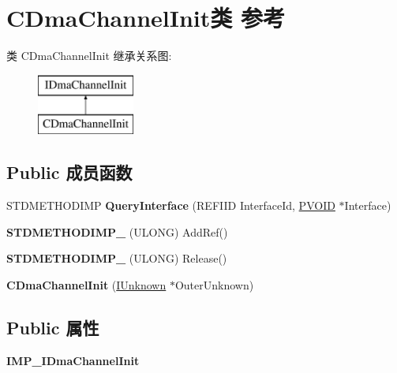 \hypertarget{class_c_dma_channel_init}{}\section{C\+Dma\+Channel\+Init类 参考}
\label{class_c_dma_channel_init}
类 C\+Dma\+Channel\+Init 继承关系图\+:\begin{figure}[H]
\begin{center}
\leavevmode
\includegraphics[height=2.000000cm]{class_c_dma_channel_init}
\end{center}
\end{figure}
\subsection*{Public 成员函数}
\begin{DoxyCompactItemize}
\item 
\mbox{\label{class_c_dma_channel_init_ae421fabc39c46402e245bc0d9496182a}} 
S\+T\+D\+M\+E\+T\+H\+O\+D\+I\+MP {\bfseries Query\+Interface} (R\+E\+F\+I\+ID Interface\+Id, \hyperlink{interfacevoid}{P\+V\+O\+ID} $\ast$Interface)
\item 
\mbox{\label{class_c_dma_channel_init_a0effed86839819835c176a9ee7061f5b}} 
{\bfseries S\+T\+D\+M\+E\+T\+H\+O\+D\+I\+M\+P\+\_\+} (U\+L\+O\+NG) Add\+Ref()
\item 
\mbox{\label{class_c_dma_channel_init_a31f2b9279468892f2b87d6f1f4ee0f45}} 
{\bfseries S\+T\+D\+M\+E\+T\+H\+O\+D\+I\+M\+P\+\_\+} (U\+L\+O\+NG) Release()
\item 
\mbox{\label{class_c_dma_channel_init_af105045ba74b7a521fe927aea73ad00e}} 
{\bfseries C\+Dma\+Channel\+Init} (\hyperlink{interface_i_unknown}{I\+Unknown} $\ast$Outer\+Unknown)
\end{DoxyCompactItemize}
\subsection*{Public 属性}
\begin{DoxyCompactItemize}
\item 
\mbox{\label{class_c_dma_channel_init_a576a262eead81163daaae8cb59d1616f}} 
{\bfseries I\+M\+P\+\_\+\+I\+Dma\+Channel\+Init}
\end{DoxyCompactItemize}
